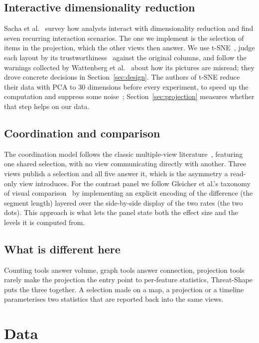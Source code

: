 \documentclass[conference]{IEEEtran}
\begin{document}
\subsection{Interactive dimensionality reduction}

Sacha et al.~\cite{sacha} survey how analysts interact with dimensionality reduction and
find seven recurring interaction scenarios. The one we implement is the selection of items in the projection, which the other views then answer. We use t-SNE~\cite{tsne},
judge each layout by its trustworthiness~\cite{venna} against the original columns, and follow the
warnings collected by Wattenberg et al.~\cite{misread} about how its pictures are
misread; they drove concrete decisions in Section~\ref{sec:design}. The authors of t-SNE reduce their data with PCA to 30 dimensions before every experiment, to speed up the computation and suppress some noise~\cite{tsne}; Section~\ref{sec:projection} measures whether that step helps on our data.

\subsection{Coordination and comparison}

The coordination model follows the classic multiple-view literature~\cite{roberts}, featuring one shared selection, with no view communicating directly with another. Three views publish a selection and all five answer it, which is the asymmetry a read-only view introduces. For the contrast panel we follow Gleicher et al.'s taxonomy of visual
comparison~\cite{gleicher} by implementing an explicit encoding of the difference (the segment length) layered over the side-by-side display of the two rates (the two dots). This approach is what lets the panel state both the effect size and the levels it is computed from.

\subsection{What is different here}

Counting tools answer volume, graph tools answer connection, projection tools rarely make the projection the entry point to per-feature statistics, Threat-Shape puts the three together. A selection made on a map, a projection or a timeline parameterises two
statistics that are reported back into the same views.

\section{Data}
\end{document}
